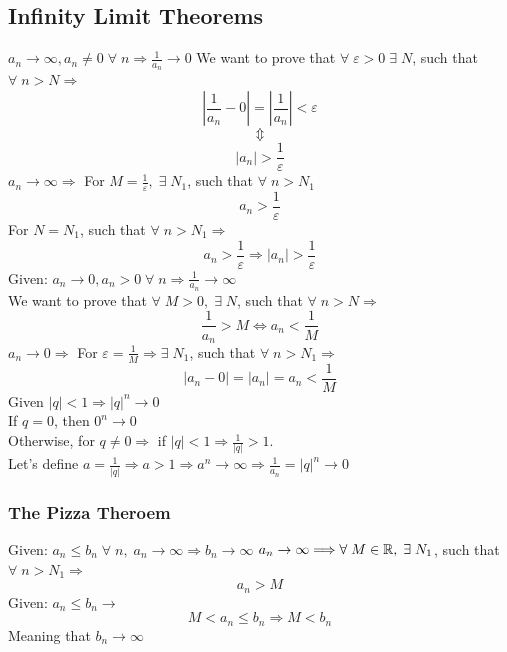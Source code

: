 \subsection{Infinity Limit Theorems}
$a_n\rightarrow \infty, a_n\neq 0 \;\forall\; n \Longrightarrow \frac{1}{a_n}\rightarrow 0$
We want to prove that $\forall\; \varepsilon>0\; \exists\; N$, such that $\forall\; n>N\Longrightarrow$
\[
    |\frac{1}{a_n} - 0| = |\frac{1}{a_n}|<\varepsilon
\]
\[
    \Updownarrow
\]
\[
    |a_n|>\frac{1}{\varepsilon}
\]
$a_n\rightarrow \infty \Longrightarrow$ For $M=\frac{1}{\varepsilon},\; \exists\;N_1$, such that $\forall\; n>N_1$
\[
    a_n>\frac{1}{\varepsilon}
\]
For $N=N_1$, such that $\forall\; n>N_1\Longrightarrow$
\[
    a_n>\frac{1}{\varepsilon} \Longrightarrow |a_n|>\frac{1}{\varepsilon}
\]
Given: $a_n\rightarrow 0, a_n>0\; \forall\; n\Longrightarrow \frac{1}{a_n}\rightarrow \infty$\\
We want to prove that $\forall\; M>0,\; \exists\;N$, such that $\forall\; n>N\Longrightarrow$
\[
    \frac{1}{a_n}>M \iff a_n<\frac{1}{M}
\]
$a_n\rightarrow 0 \Longrightarrow$ For $\varepsilon = \frac{1}{M}\Longrightarrow \exists\; N_1$, such that $\forall\; n>N_1\Longrightarrow$
\[
    |a_n-0| = |a_n| = a_n<\frac{1}{M}
\]
Given $|q|<1 \Longrightarrow |q|^n\rightarrow 0$\\
If $q = 0$, then $0^n \rightarrow 0$\\
Otherwise, for $q\neq 0 \Longrightarrow$ if $|q|<1 \Longrightarrow \frac{1}{|q|}>1$.\\
Let's define $a = \frac{1}{|q|}\Longrightarrow a>1 \Longrightarrow a^n \rightarrow \infty \Longrightarrow \frac{1}{a_n} = |q|^n \rightarrow 0$\\
\subsubsection{The Pizza Theroem}
Given: $a_n\leq b_n\; \forall\;n,\; a_n\rightarrow\infty\Longrightarrow b_n\rightarrow \infty$
$a_n\rightarrow \infty \Longrightarrow \forall\; M\in \mathbb{R},\; \exists\; N_1$, such that $\forall\; n>N_1 \Longrightarrow$
\[
    a_n>M
\]
Given: $a_n\leq b_n \rightarrow$
\[
    M<a_n\leq b_n \Longrightarrow M<b_n
\]
Meaning that $b_n\rightarrow\infty$